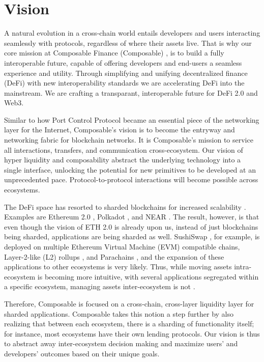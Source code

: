 \section{Vision}

A natural evolution in a cross-chain world entails developers and users interacting seamlessly with protocols, regardless of where their assets live. That is why our core mission at Composable Finance (Composable) \cite{ComposableFinance}, is to build a fully interoperable future, capable of offering developers and end-users a seamless experience and utility.
%
Through simplifying and unifying decentralized finance (DeFi) \cite{DecentralizedEthereum.org} with new interoperability standards we are accelerating DeFi into the mainstream. We are crafting a transparant, interoperable future for DeFi 2.0 and Web3.

Similar to how Port Control Protocol \cite{PortWikipedia} became an essential piece of the networking layer for the Internet, Composable's vision is to become the entryway and networking fabric for blockchain networks. It is Composable's mission to service all interactions, transfers, and communication cross-ecosystem.
%
Our vision of hyper liquidity and composability abstract the underlying technology into a single interface, unlocking the potential for new primitives to be developed at an unprecedented pace. Protocol-to-protocol interactions will become possible across ecosystems.

The DeFi space has resorted to sharded blockchains for increased scalability \cite{WhyProperties,WhatCoinDesk}. Examples are Ethereum 2.0 \cite{TheEthereum.org}, Polkadot \cite{Polkadot:Platform}, and NEAR \cite{NEARWorld}. The result, however, is that even though the vision of ETH 2.0 is already upon us, instead of just blockchains being sharded, applications are being sharded as well. SushiSwap \cite{IntroductionSushi}, for example, is deployed on multiple Ethereum Virtual Machine (EVM) \cite{EthereumEthereum.org} compatible chains, Layer-2-like (L2) rollups \cite{LayerEthereum.org}, and Parachains \cite{WhatAlexandria}, and the expansion of these applications to other ecosystems is very likely. Thus, while moving assets intra-ecosystem is becoming more intuitive, with several applications segregated within a specific ecosystem, managing assets inter-ecosystem is not \cite{0xbrainjarOurMedium}.

Therefore, Composable is focused on a cross-chain, cross-layer liquidity layer for sharded applications. Composable takes this notion a step further by also realizing that between each ecosystem, there is a sharding of functionality itself; for instance, most ecosystems have their own lending protocols. Our vision is thus to abstract away inter-ecosystem decision making and maximize users' and developers' outcomes based on their unique goals.

